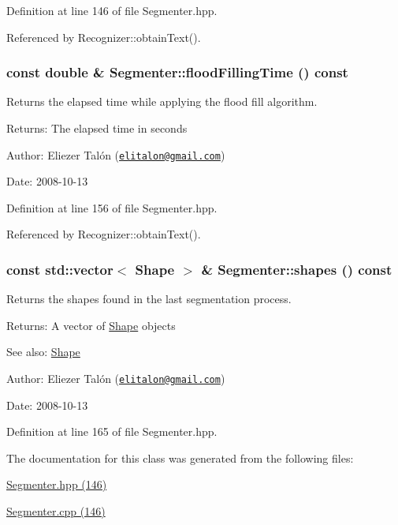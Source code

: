 Definition at line 146 of file Segmenter.hpp.

Referenced by Recognizer::obtainText().\hypertarget{class_segmenter_e7c93cb16e314baeb713bbd6ca9b667b}{
\subsubsection[floodFillingTime]{\setlength{\rightskip}{0pt plus 5cm}const double \& Segmenter::floodFillingTime () const}}
\label{class_segmenter_e7c93cb16e314baeb713bbd6ca9b667b}


Returns the elapsed time while applying the flood fill algorithm. 

\begin{Desc}
\item[Returns:]The elapsed time in seconds\end{Desc}
\begin{Desc}
\item[Author:]Eliezer Talón (\href{mailto:elitalon@gmail.com}{\tt elitalon@gmail.com}) \end{Desc}
\begin{Desc}
\item[Date:]2008-10-13 \end{Desc}


Definition at line 156 of file Segmenter.hpp.

Referenced by Recognizer::obtainText().\hypertarget{class_segmenter_f2dd7f34c8b0f902323005335e41bd57}{
\subsubsection[shapes]{\setlength{\rightskip}{0pt plus 5cm}const std::vector$<$ {\bf Shape} $>$ \& Segmenter::shapes () const}}
\label{class_segmenter_f2dd7f34c8b0f902323005335e41bd57}


Returns the shapes found in the last segmentation process. 

\begin{Desc}
\item[Returns:]A vector of \hyperlink{class_shape}{Shape} objects\end{Desc}
\begin{Desc}
\item[See also:]\hyperlink{class_shape}{Shape}\end{Desc}
\begin{Desc}
\item[Author:]Eliezer Talón (\href{mailto:elitalon@gmail.com}{\tt elitalon@gmail.com}) \end{Desc}
\begin{Desc}
\item[Date:]2008-10-13 \end{Desc}


Definition at line 165 of file Segmenter.hpp.

The documentation for this class was generated from the following files:\begin{CompactItemize}
\item 
\hyperlink{_segmenter_8hpp}{Segmenter.hpp (146)}\item 
\hyperlink{_segmenter_8cpp}{Segmenter.cpp (146)}\end{CompactItemize}
